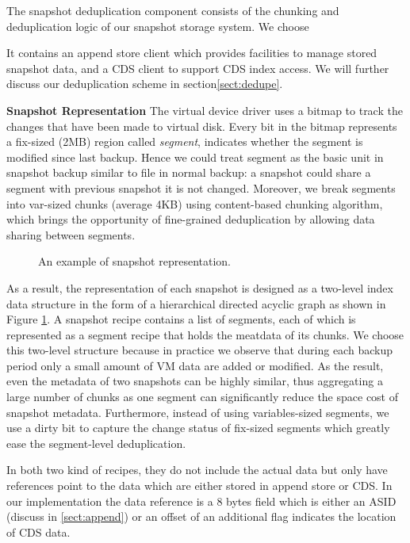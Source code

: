 The snapshot deduplication component consists of the chunking and deduplication 
logic of our snapshot storage system. We choose 

It contains an append store client which provides facilities to manage stored snapshot data, and a CDS client to support CDS index access. We will further discuss our deduplication scheme in section\ref{sect:dedupe}.

{\bf Snapshot Representation}
The virtual device driver uses a bitmap to track the changes 
that have been made to virtual disk.
Every bit in the bitmap represents a fix-sized (2MB) region called \textit{segment}, indicates whether the segment
is modified since last backup. Hence we could treat segment as the basic unit 
in snapshot backup similar to
file in normal backup: a snapshot could share a segment with previous snapshot it is not changed. 
Moreover, we break 
segments into var-sized chunks (average 4KB) using content-based chunking algorithm,
which brings the opportunity of fine-grained deduplication by
allowing data sharing between segments.

\begin{figure}[htbp]
  \centering
  \caption{An example of snapshot representation.}
  \label{fig:snapshot_rep}
\end{figure}
As a result, the representation of each snapshot is designed as a two-level index data structure 
in the form of a hierarchical directed acyclic graph as shown in Figure \ref{fig:snapshot_rep}.
A snapshot recipe contains a list of segments, each of which is represented as a segment recipe
that holds the meatdata of its chunks. We choose this two-level structure because in practice we
observe that during each backup period only a small amount of VM data are added or modified. 
As the result, even the metadata of two snapshots can be highly similar, 
thus aggregating a large number of chunks as one segment can significantly reduce the space cost of snapshot metadata.
Furthermore, instead of using variables-sized segments, we use a dirty bit to capture the change status of fix-sized
segments which greatly ease the segment-level deduplication.

In both two kind of recipes, 
they do not include the actual data but only have
 references point to the data which are either stored in append store or CDS.
In our implementation the data reference is a 8 bytes field which is either an 
ASID (discuss in \ref{sect:append}) or an offset of an additional flag indicates
the location of CDS data.


